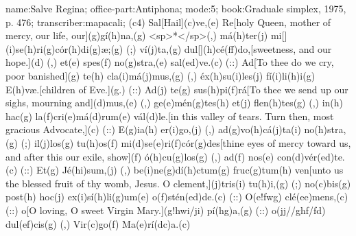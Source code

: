 name:Salve Regina;
office-part:Antiphona;
mode:5;
book:Graduale simplex, 1975, p. 476;
transcriber:mapacali;
(c4) Sal[Hail](c)ve,(e) Re[holy Queen, mother of mercy, our life, our](g)gí(h)na,(g) <sp>*</sp>(,) má(h)ter(j) mi[](i)se(h)ri(g)cór(h)di(g)æ;(g) (;) ví(j)ta,(g) dul[](h)cé(ff)do,[sweetness, and our hope.](d) (,) et(e) spes(f) no(g)stra,(e) sal(ed)ve.(c) (::) Ad[To thee do we cry, poor banished](g) te(h) cla(i)má(j)mus,(g) (,) éx(h)su(i)les(j) fí(i)li(h)i(g) E(h)væ.[children of Eve.](g.) (::) Ad(j) te(g) sus(h)pi(f)rá[To thee we send up our sighs, mourning and](d)mus,(e) (,) ge(e)mén(g)tes(h) et(j) flen(h)tes(g) (,) in(h) hac(g) la(f)cri(e)má(d)rum(e) vál(d)le.[in this valley of tears. Turn then, most gracious Advocate,](c) (::) E(g)ia(h) er(i)go,(j) (,) ad(g)vo(h)cá(j)ta(i) no(h)stra,(g) (;) il(j)los(g) tu(h)os(f) mi(d)se(e)ri(f)cór(g)des[thine eyes of mercy toward us, and after this our exile, show](f) ó(h)cu(g)los(g) (,) ad(f) nos(e) con(d)vér(ed)te.(c) (::) Et(g) Jé(hi)sum,(j) (,) be(i)ne(g)dí(h)ctum(g) fruc(g)tum(h) ven[unto us the blessed fruit of thy womb, Jesus. O clement,](j)tris(i) tu(h)i,(g) (;) no(c)bis(g) post(h) hoc(j) ex(i)sí(h)li(g)um(e) o(f)stén(ed)de.(c) (::) O(e!fwg) clé(ee)mens,(c) (::) o[O loving, O sweet Virgin Mary.](g!hwi/ji) pí(hg)a,(g) (::) o(jj//ghf/fd) dul(ef)cis(g) (,) Vir(c)go(f) Ma(e)rí(dc)a.(c) 